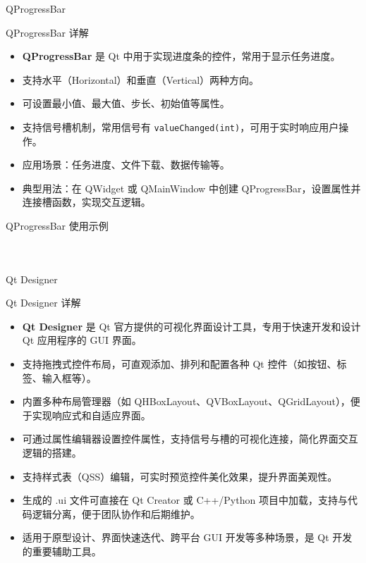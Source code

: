 \documentclass[UTF8,aspectratio=169]{beamer}
\begin{document}
\begin{frame}{QProgressBar}
    \begin{ytublock}{QProgressBar 详解}
        \begin{itemize}
            \item \textbf{QProgressBar} 是 Qt 中用于实现进度条的控件，常用于显示任务进度。
            \item 支持水平（Horizontal）和垂直（Vertical）两种方向。
            \item 可设置最小值、最大值、步长、初始值等属性。
            \item 支持信号槽机制，常用信号有 \texttt{valueChanged(int)}，可用于实时响应用户操作。
            \item 应用场景：任务进度、文件下载、数据传输等。
            \item 典型用法：在 QWidget 或 QMainWindow 中创建 QProgressBar，设置属性并连接槽函数，实现交互逻辑。
        \end{itemize}
    \end{ytublock}
\end{frame}

\begin{frame}[fragile]{QProgressBar 使用示例}
    \begin{columns}
        \begin{column}{0.48\textwidth}
            \inputminted[firstline=14,lastline=28]{cpp}{code/qt_progressbar_example.cpp}
        \end{column}
        \begin{column}{0.48\textwidth}
            \inputminted[firstline=29,lastline=43]{cpp}{code/qt_progressbar_example.cpp}
        \end{column}
    \end{columns}
\end{frame}

\begin{frame}{Qt Designer}
    \begin{ytublock}{Qt Designer 详解}
        \begin{itemize}
            \item \textbf{Qt Designer} 是 Qt 官方提供的可视化界面设计工具，专用于快速开发和设计 Qt 应用程序的 GUI 界面。
            \item 支持拖拽式控件布局，可直观添加、排列和配置各种 Qt 控件（如按钮、标签、输入框等）。
            \item 内置多种布局管理器（如 QHBoxLayout、QVBoxLayout、QGridLayout），便于实现响应式和自适应界面。
            \item 可通过属性编辑器设置控件属性，支持信号与槽的可视化连接，简化界面交互逻辑的搭建。
            \item 支持样式表（QSS）编辑，可实时预览控件美化效果，提升界面美观性。
            \item 生成的 .ui 文件可直接在 Qt Creator 或 C++/Python 项目中加载，支持与代码逻辑分离，便于团队协作和后期维护。
            \item 适用于原型设计、界面快速迭代、跨平台 GUI 开发等多种场景，是 Qt 开发的重要辅助工具。
        \end{itemize}
    \end{ytublock}
\end{frame}
\end{document}
